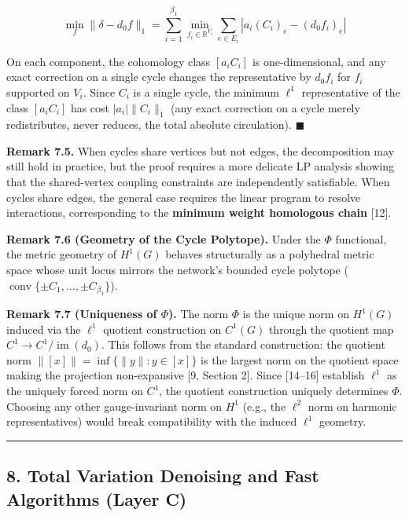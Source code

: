 \documentclass[
]{article}
\begin{document}
\[\min_f \|\delta - d_0 f\|_1 = \sum_{i=1}^{\beta_1} \min_{f_i \in \mathbb{R}^{V_i}} \sum_{e \in E_i} |a_i (C_i)_e - (d_0 f_i)_e|\]

On each component, the cohomology class \([a_i C_i]\) is
one-dimensional, and any exact correction on a single cycle changes the
representative by \(d_0 f_i\) for \(f_i\) supported on \(V_i\). Since
\(C_i\) is a single cycle, the minimum \(\ell^1\) representative of the
class \([a_i C_i]\) has cost \(|a_i| \|C_i\|_1\) (any exact correction
on a cycle merely redistributes, never reduces, the total absolute
circulation). \(\blacksquare\)

\textbf{Remark 7.5.} When cycles share vertices but not edges, the
decomposition may still hold in practice, but the proof requires a more
delicate LP analysis showing that the shared-vertex coupling constraints
are independently satisfiable. When cycles share edges, the general case
requires the linear program to resolve interactions, corresponding to
the \textbf{minimum weight homologous chain} {[}12{]}.

\textbf{Remark 7.6 (Geometry of the Cycle Polytope).} Under the \(\Phi\)
functional, the metric geometry of \(H^1(G)\) behaves structurally as a
polyhedral metric space whose unit locus mirrors the network's bounded
cycle polytope
(\(\operatorname{conv}\{\pm C_1, \ldots, \pm C_{\beta_1}\}\)).

\textbf{Remark 7.7 (Uniqueness of \(\Phi\)).} The norm \(\Phi\) is the
unique norm on \(H^1(G)\) induced via the \(\ell^1\) quotient
construction on \(C^1(G)\) through the quotient map
\(C^1 \to C^1/\operatorname{im}(d_0)\). This follows from the standard
construction: the quotient norm \(\|[x]\| = \inf\{\|y\| : y \in [x]\}\)
is the largest norm on the quotient space making the projection
non-expansive {[}9, Section 2{]}. Since {[}14--16{]} establish
\(\ell^1\) as the uniquely forced norm on \(C^1\), the quotient
construction uniquely determines \(\Phi\). Choosing any other
gauge-invariant norm on \(H^1\) (e.g., the \(\ell^2\) norm on harmonic
representatives) would break compatibility with the induced \(\ell^1\)
geometry.

\begin{center}\rule{0.5\linewidth}{0.5pt}\end{center}

\subsection{\texorpdfstring{8. Total Variation Denoising and Fast
Algorithms \textbf{(Layer
C)}}{8. Total Variation Denoising and Fast Algorithms (Layer C)}}\label{total-variation-denoising-and-fast-algorithms-layer-c}
\end{document}
